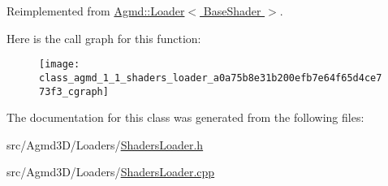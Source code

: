 Reimplemented from \hyperlink{class_agmd_1_1_loader_abf633648c648f0c6152a559c3e4be682}{Agmd\+::\+Loader$<$ Base\+Shader $>$}.



Here is the call graph for this function\+:\nopagebreak
\begin{figure}[H]
\begin{center}
\leavevmode
\texttt{[image: class\_agmd\_1\_1\_shaders\_loader\_a0a75b8e31b200efb7e64f65d4ce773f3\_cgraph]}
\end{center}
\end{figure}




The documentation for this class was generated from the following files\+:\begin{DoxyCompactItemize}
\item 
src/\+Agmd3\+D/\+Loaders/\hyperlink{_shaders_loader_8h}{Shaders\+Loader.\+h}\item 
src/\+Agmd3\+D/\+Loaders/\hyperlink{_shaders_loader_8cpp}{Shaders\+Loader.\+cpp}\end{DoxyCompactItemize}
